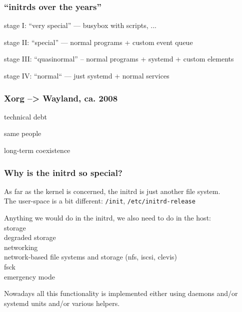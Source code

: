 \documentclass[]{beamer}
\begin{document}
\begin{frame}
  \frametitle{``initrds over the years''}

  \pause


  stage I: ``very special'' — busybox with scripts, ...

  \pause

  stage II: ``special'' — normal programs + custom event queue

  \pause

  stage III: ``quasinormal'' – normal programs + systemd + custom elements

  \pause

  stage IV: ``normal`` — just systemd + normal services
\end{frame}

\begin{frame}
  \frametitle{Xorg --> Wayland, ca. 2008}

  technical debt

  same people

  long-term coexistence
\end{frame}

\begin{frame}
  \frametitle{Why is the initrd so special?}

  As far as the kernel is concerned, the initrd is just another file system.\\

  The user-space is a bit different: 
  \texttt{/init}, \texttt{/etc/initrd-release}\\


  \pause

  Anything we would do in the initrd, we also need to do in the host:\\
  storage\\
  degraded storage\\
  networking\\
  network-based file systems and storage (nfs, iscsi, clevis)\\
  fsck\\
  emergency mode\\

  \pause

  Nowadays all this functionality is implemented either using daemons
  and/or systemd units and/or various helpers.
\end{frame}
\end{document}
